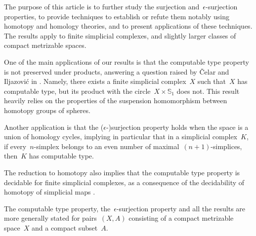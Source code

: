 \documentclass[english,11pt]{article}
\theoremstyle{plain}
\theoremstyle{remark}
\theoremstyle{definition}
\newcommand{\Sp}{\mathbb{S}}
\begin{document}
The purpose of this article is to further study the surjection and~$\epsilon$-surjection properties, to provide techniques to establish or refute them notably using homotopy and homology theories, and to present applications of these techniques. The results apply to finite simplicial complexes, and slightly larger classes of compact metrizable spaces.

One of the main applications of our results is that the computable type property is not preserved under products, answering a question raised by \v{C}elar and Iljazovi\'{c} in \cite{CI21}. Namely, there exists a finite simplicial complex~$X$ such that~$X$ has computable type, but its product with the circle~$X\times \Sp_1$ does not. This result heavily relies on the properties of the suspension homomorphism between homotopy groups of spheres.

Another application is that the ($\epsilon$-)surjection property holds when the space is a union of homology cycles, implying in particular that in a simplicial complex~$K$, if every~$n$-simplex belongs to an even number of maximal~$(n+1)$-simplices, then~$K$ has computable type.

The reduction to homotopy also implies that the computable type property is decidable for finite simplicial complexes, as a consequence of the decidability of homotopy of simplicial maps \cite{FV20}.


The computable type property, the~$\epsilon$-surjection property and all the results are more generally stated for pairs~$(X,A)$ consisting of a compact metrizable space~$X$ and a compact subset~$A$.

% 
%
%
%
%
%
%
%
%
%
\end{document}
